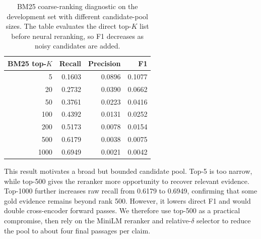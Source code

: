 \documentclass[11pt]{article}
\begin{document}
\begin{table}[t]
  \centering
  \small
  \setlength{\tabcolsep}{5pt}
  \begin{tabular}{rrrr}
    \toprule
    \textbf{BM25 top-$K$} & \textbf{Recall} & \textbf{Precision} & \textbf{F1} \\
    \midrule
    5   & 0.1603 & 0.0896 & 0.1077 \\
    20  & 0.2732 & 0.0390 & 0.0662 \\
    50  & 0.3761 & 0.0223 & 0.0416 \\
    100 & 0.4392 & 0.0131 & 0.0252 \\
    200 & 0.5173 & 0.0078 & 0.0154 \\
    500 & 0.6179 & 0.0038 & 0.0075 \\
    1000 & 0.6949 & 0.0021 & 0.0042 \\
    \bottomrule
  \end{tabular}
  \caption{BM25 coarse-ranking diagnostic on the development set with different candidate-pool sizes. The table evaluates the direct top-$K$ list before neural reranking, so F1 decreases as noisy candidates are added.}
  \label{tab:bm25s-topk}
\end{table}

This result motivates a broad but bounded candidate pool. Top-5 is too narrow, while top-500 gives the reranker more opportunity to recover relevant evidence. Top-1000 further increases raw recall from 0.6179 to 0.6949, confirming that some gold evidence remains beyond rank 500. However, it lowers direct F1 and would double cross-encoder forward passes. We therefore use top-500 as a practical compromise, then rely on the MiniLM reranker and relative-$\delta$ selector to reduce the pool to about four final passages per claim.
\end{document}
